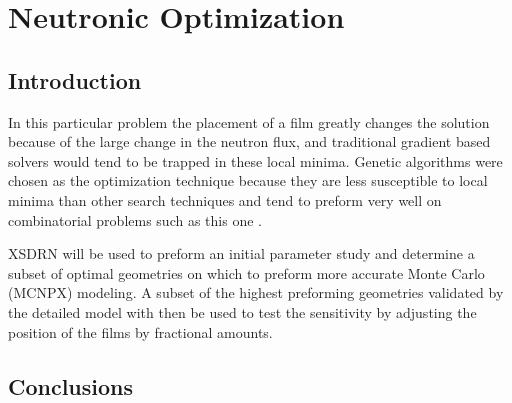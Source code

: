 \chapter{Neutronic Optimization}
\label{chap:GARPMOpt}
\section{Introduction}

In this particular problem the placement of a film greatly changes the solution because of the large change in the neutron flux, and traditional gradient based solvers would tend to be trapped in these local minima.
Genetic algorithms were chosen as the optimization technique because they are less susceptible to local minima than other search techniques and tend to preform very well on combinatorial problems such as this one \cite{Mitchell_1997}.



XSDRN will be used to preform an initial parameter study and determine a subset of optimal geometries on which to preform more accurate Monte Carlo (MCNPX) modeling. 
A subset of the highest preforming geometries validated by the detailed model with then be used to test the sensitivity by adjusting the position of the films by fractional amounts.





\section{Conclusions}


